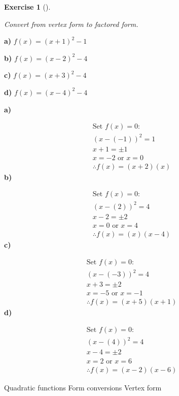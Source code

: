 \documentclass[
  letterpaper,
  DIV=11,
  numbers=noendperiod]{scrreprt}
\theoremstyle{definition}
\newtheorem{exercise}{Exercise}[chapter]
\theoremstyle{remark}
\begin{document}
\begin{exercise}[]\protect\hypertarget{exr-u7-22}{}\label{exr-u7-22}

\emph{Convert from vertex form to factored form.}

\textbf{a)} \(\displaystyle f(x) = (x + 1)^2 - 1\)

\textbf{b)} \(\displaystyle f(x) = (x - 2)^2 - 4\)

\textbf{c)} \(\displaystyle f(x) = (x + 3)^2 - 4\)

\textbf{d)} \(\displaystyle f(x) = (x - 4)^2 - 4\)

\begin{tcolorbox}[enhanced jigsaw, opacitybacktitle=0.6, coltitle=black, arc=.35mm, colframe=quarto-callout-tip-color-frame, colback=white, bottomrule=.15mm, left=2mm, colbacktitle=quarto-callout-tip-color!10!white, titlerule=0mm, opacityback=0, title=\textcolor{quarto-callout-tip-color}{\faLightbulb}\hspace{0.5em}{🔍 View Solutions}, leftrule=.75mm, breakable, rightrule=.15mm, bottomtitle=1mm, toptitle=1mm, toprule=.15mm]

\textbf{a)}

\[
\begin{aligned}
\text{Set } f(x) = 0: \\[4pt] (x - (-1))^2 = 1 \\[4pt] x + 1 = \pm 1 \\[4pt] x = -2 \text{ or } x = 0 \\[4pt] \therefore f(x) = (x + 2)(x)
\end{aligned}
\] \textbf{b)}

\[
\begin{aligned}
\text{Set } f(x) = 0: \\[4pt] (x - (2))^2 = 4 \\[4pt] x - 2 = \pm 2 \\[4pt] x = 0 \text{ or } x = 4 \\[4pt] \therefore f(x) = (x)(x - 4)
\end{aligned}
\] \textbf{c)}

\[
\begin{aligned}
\text{Set } f(x) = 0: \\[4pt] (x - (-3))^2 = 4 \\[4pt] x + 3 = \pm 2 \\[4pt] x = -5 \text{ or } x = -1 \\[4pt] \therefore f(x) = (x + 5)(x + 1)
\end{aligned}
\] \textbf{d)}

\[
\begin{aligned}
\text{Set } f(x) = 0: \\[4pt] (x - (4))^2 = 4 \\[4pt] x - 4 = \pm 2 \\[4pt] x = 2 \text{ or } x = 6 \\[4pt] \therefore f(x) = (x - 2)(x - 6)
\end{aligned}
\]

\end{tcolorbox}

{Quadratic functions} {Form conversions} {Vertex form}

\end{exercise}
\end{document}
